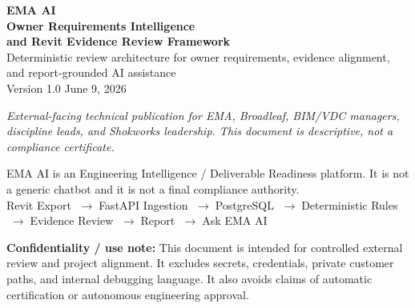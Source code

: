 \documentclass[10pt,letterpaper]{article}
\newcommand{\flowarrow}{\ensuremath{\;\boldsymbol{\rightarrow}\;}}
\begin{document}
\color{emaText}

\thispagestyle{empty}
\begin{tcolorbox}[colback=white,colframe=emaNavy,boxrule=1.5pt,arc=5mm,
  left=20pt,right=20pt,top=28pt,bottom=28pt]
\begin{center}
  \vspace{4pt}
  {\Huge\bfseries\textcolor{emaNavy}{EMA AI}}\\[2pt]
  {\Huge\bfseries\textcolor{emaNavy}{Owner Requirements Intelligence}}\\[2pt]
  {\Huge\bfseries\textcolor{emaNavy}{and Revit Evidence Review Framework}}\\[12pt]
  {\Large\textcolor{emaMuted}{Deterministic review architecture for owner requirements, evidence alignment, and report-grounded AI assistance}}\\[16pt]
  {\normalsize\textcolor{emaSlate}{Version 1.0 \hspace{10pt} June 9, 2026}}\\[16pt]
  \begin{tcolorbox}[colback=emaSoft,colframe=emaLine,boxrule=0.5pt,arc=2mm,
    left=14pt,right=14pt,top=8pt,bottom=8pt]
    {\small\itshape\textcolor{emaMuted}{External-facing technical publication for EMA, Broadleaf, BIM/VDC managers, discipline leads, and Shokworks leadership. This document is descriptive, not a compliance certificate.}}
  \end{tcolorbox}
  \vspace{10pt}
  {\footnotesize\textcolor{emaMuted}{EMA AI is an Engineering Intelligence / Deliverable Readiness platform. It is not a generic chatbot and it is not a final compliance authority.}}\\[4pt]
  {\footnotesize\textcolor{emaMuted}{Revit Export \flowarrow FastAPI Ingestion \flowarrow PostgreSQL \flowarrow Deterministic Rules \flowarrow Evidence Review \flowarrow Report \flowarrow Ask EMA AI}}
\end{center}
\end{tcolorbox}

\vfill
\begin{tcolorbox}[colback=emaSoft2,colframe=emaLine,arc=2mm]
\small\textbf{Confidentiality / use note:} This document is intended for controlled external review and project alignment. It excludes secrets, credentials, private customer paths, and internal debugging language. It also avoids claims of automatic certification or autonomous engineering approval.
\end{tcolorbox}
\end{document}
